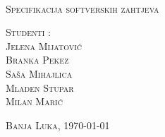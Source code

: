 \begin{titlepage}
\begin{center}
	\textsc{\huge \naziv}\\
\textsc{Specifikacija softverskih zahtjeva}\\
	 \end{center}
\vspace{50mm}

	 \textsc{Studenti : \\}
\textsc{Jelena Mijatović}\\
	\textsc{            Branka Pekez}\\
		\textsc{            Saša Mihajlica}\\
			\textsc{            Mladen Stupar}\\
				\textsc{            Milan Marić}\\
\begin{center}
\textsc{Banja Luka, \today}
\end{center}
\end{titlepage}
